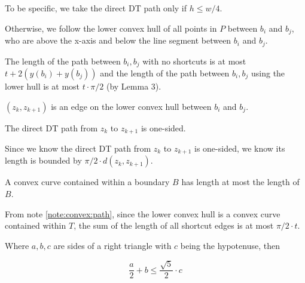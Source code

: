 \documentclass{tufte-handout}
\begin{document}
\newpage

To be specific, we take the direct DT path only if $h \le w/4$.

Otherwise, we follow the lower convex hull of all points in $P$
between $b_i$ and $b_j$, who are above the x-axis and below the line
segment between $b_i$ and $b_j$.

The length of the path between $b_i,b_j$ with no shortcuts is at most
$t + 2(y(b_i) + y(b_j))$ and the length of the path between $b_i,b_j$
using the lower hull is at most $t \cdot \pi /2$ (by Lemma 3).


$(z_k,z_{k+1})$ is an edge on the lower convex hull between $b_i$ and
$b_j$.  

\begin{Lemma}[4]

  \label{lemma:convex:path:one:sided}

  The direct DT path from $z_k$ to $z_{k+1}$ is one-sided.
  
\end{Lemma}

Since we know the direct DT path from $z_k$ to $z_{k+1}$ is one-sided,
we know its length is bounded by $\pi/2 \cdot d(z_k,z_{k+1})$.

\begin{Note}
  \label{note:convex:path}

  A convex curve contained within a boundary $B$ has length at most
  the length of $B$. \cite{Benson:1966} %


\end{Note}

From note \ref{note:convex:path}, since the lower convex hull is a
convex curve contained within $T$, the sum of the length of all
shortcut edges is at most $\pi/2 \cdot t$.

\newpage

\begin{Note}
  \label{note:right:triangle}

  Where $a,b,c$ are sides of a right triangle with $c$ being the
  hypotenuse, then

  \begin{displaymath}
    \frac{a}{2} + b \le \frac{\sqrt{5}}{2} \cdot c
  \end{displaymath}
  
\end{Note}
\end{document}
